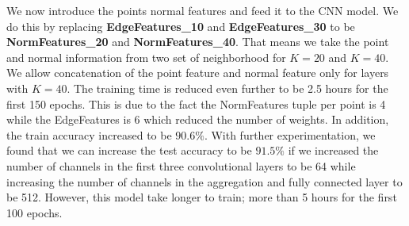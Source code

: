 We now introduce the points normal features and feed it to the CNN model. We do this by replacing \textbf{EdgeFeatures\_10} and \textbf{EdgeFeatures\_30} to be \textbf{NormFeatures\_20} and \textbf{NormFeatures\_40}. That means we take the point and normal information from two set of neighborhood for $K=20$ and $K=40$. We allow concatenation of the point feature and normal feature only for layers with $K=40$. The training time is reduced even further to be 2.5 hours for the first 150 epochs. This is due to the fact the NormFeatures tuple per point is 4 while the EdgeFeatures is 6 which reduced the number of weights. In addition, the train accuracy increased to be $90.6\%$. With further experimentation, we found that we can increase the test accuracy to be $91.5\%$ if we increased the number of channels in the first three convolutional layers to be 64 while increasing the number of channels in the aggregation and fully connected layer to be 512. However, this model take longer to train; more than 5 hours for the first 100 epochs. 